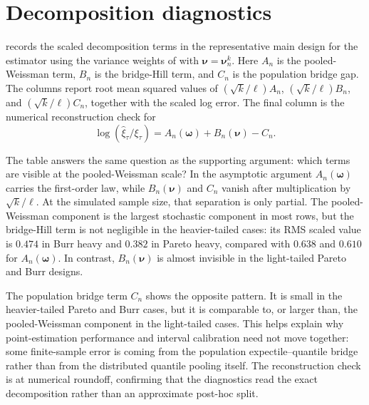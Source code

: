 \section{Decomposition diagnostics}
\label{sec:sim:decomposition}

 records the scaled decomposition terms in the
representative main design for the estimator using
the variance weights of \textcite{DaouiaPadoanStupfler2021} with
\(\bm\nu=\bm\nu_n^k\). Here \(A_n\) is the pooled-Weissman term, \(B_n\) is the
bridge-Hill term, and \(C_n\) is the population bridge gap. The
columns report root mean squared values of
\((\sqrt{k}/\ell)A_n\), \((\sqrt{k}/\ell)B_n\), and
\((\sqrt{k}/\ell)C_n\), together with the scaled log error. The final column
is the numerical reconstruction check for
\[
  \log(\widehat\xi_\tau/\xi_\tau)=A_n(\bm\omega)+B_n(\bm\nu)-C_n.
\]

The table answers the same question as the supporting argument: which terms
are visible at the pooled-Weissman scale? In the asymptotic argument
\(A_n(\bm\omega)\) carries the first-order law, while \(B_n(\bm\nu)\) and
\(C_n\) vanish after multiplication by \(\sqrt{k}/\ell\). At the simulated
sample size, that separation is only partial. The pooled-Weissman component
is the largest stochastic component in most rows, but the bridge-Hill term is
not negligible in the heavier-tailed cases: its RMS scaled value is \(0.474\)
in Burr heavy and \(0.382\) in Pareto heavy, compared with \(0.638\) and
\(0.610\) for \(A_n(\bm\omega)\). In contrast, \(B_n(\bm\nu)\) is almost
invisible in the light-tailed Pareto and Burr designs.

The population bridge term \(C_n\) shows the opposite pattern. It is small in
the heavier-tailed Pareto and Burr cases, but it is comparable to, or larger
than, the pooled-Weissman component in the light-tailed cases. This helps
explain why point-estimation performance and interval calibration need not
move together: some finite-sample error is coming from the population
expectile--quantile bridge rather than from the distributed quantile pooling
itself. The reconstruction check is at numerical roundoff, confirming that
the diagnostics read the exact decomposition rather than an approximate
post-hoc split.

\begin{table}[htbp]
\centering
\small
\caption{Finite-sample decomposition ledger in the representative main design.
The estimator uses the variance pooled-Weissman weights of
\textcite{DaouiaPadoanStupfler2021} and \(\bm\nu=\bm\nu_n^k\).}
\label{tab:sim:decomposition}
\begingroup
\setlength{\tabcolsep}{4pt}

\endgroup
\end{table}

